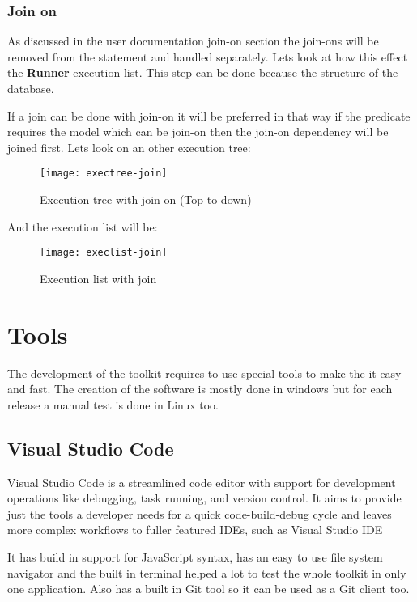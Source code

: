 \newpage
\subsubsection{Join on}
As discussed in the user documentation join-on section the join-ons will be removed from the statement and handled separately. Lets look at how this effect the \textbf{Runner} execution list. This step can be done because the structure of the database.

If a join can be done with join-on it will be preferred in that way if the predicate requires the model which can be join-on then the join-on dependency will be joined first. Lets look on an other execution tree:

 \begin{figure}[H]
	\centering
	\texttt{[image: exectree-join]}
	\caption{Execution tree with join-on (Top to down)}
	\label{fig:fig-help}
\end{figure}

And the execution list will be:

\begin{figure}[H]
	\centering
	\texttt{[image: execlist-join]}
	\caption{Execution list with join}
	\label{fig:fig-help}
\end{figure}

\section{Tools}

The development of the toolkit requires to use special tools to make the it easy and fast. The creation of the software is mostly done in windows but for each release a manual test is done in Linux too.

\subsection{Visual Studio Code}

Visual Studio Code is a streamlined code editor with support for development operations like debugging, task running, and version control. It aims to provide just the tools a developer needs for a quick code-build-debug cycle and leaves more complex workflows to fuller featured IDEs, such as Visual Studio IDE\cite{vscode}

It has build in support for JavaScript syntax, has an easy to use file system navigator and the built in terminal helped a lot to test the whole toolkit in only one application. Also has a built in Git tool so it can be used as a Git client too.

